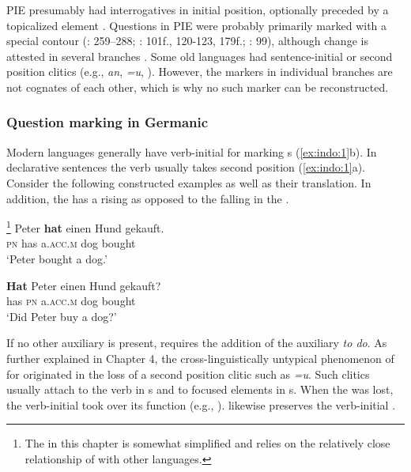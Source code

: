 PIE presumably had interrogatives in initial position, optionally preceded by a topicalized element \citep[232]{Fortson2006}. Questions in PIE were probably primarily marked with a special  contour (\citealt{Delbrück1900}: 259–288; \citealt{Lehmann1974}: 101f., 120-123, 179f.; \citealt{Hackstein2013}: 99), although  change is attested in several  branches \citep[102]{Hackstein2013}. Some old  languages had sentence-initial or second position clitics (e.g.,  \textit{an}, \textit{=u}, \citealt{BrauneHeidermanns2004}). However, the markers in individual branches are not cognates of each other, which is why no such marker can be reconstructed.

\subsubsection{Question marking in Germanic}\label{sec:5.5.2.2}

Modern  languages generally have verb-initial  for marking s (\ref{ex:indo:1}b). In declarative sentences the verb usually takes second position (\ref{ex:indo:1}a). Consider the following constructed  examples as well as their  translation. In addition, the   has a rising  as opposed to the falling  in the .

\newpage 
\ea%
    \label{ex:indo:1}
    \footnote{The  in this chapter is somewhat simplified and relies on the relatively close relationship of  with other languages.}
    \ea
    \gll Peter \textbf{{hat}} einen    Hund  gekauft.\\
    \textsc{pn}  has  a.\textsc{acc.m}  dog  bought\\
    \glt ‘Peter bought a dog.’
    
    \ex
    \gll \textbf{{Hat}} Peter  einen    Hund  gekauft?\\
    has  \textsc{pn}  a.\textsc{acc.m}  dog  bought\\
    \glt ‘Did Peter buy a dog?’
    \z
    \z

\noindent If no other auxiliary is present,  requires the addition of the auxiliary \textit{to do}. As further explained in Chapter 4, the cross-linguistically untypical phenomenon of  for  \citep{Dryer2013m} originated in the loss of a second position clitic such as  \textit{=u}. Such clitics usually attach to the verb in s and to focused elements in s. When the  was lost, the verb-initial  took over its function (e.g., \citealt{Miestamo2011}).  likewise preserves the verb-initial .

